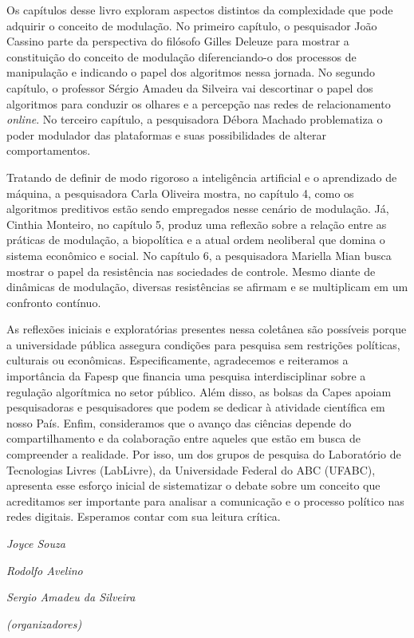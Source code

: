 Os capítulos desse livro exploram aspectos distintos da complexidade que
pode adquirir o conceito de modulação. No primeiro capítulo, o
pesquisador João Cassino parte da perspectiva do filósofo Gilles Deleuze
para mostrar a constituição do conceito de modulação diferenciando-o dos
processos de manipulação e indicando o papel dos algoritmos nessa
jornada. No segundo capítulo, o professor Sérgio Amadeu da Silveira vai
descortinar o papel dos algoritmos para conduzir os olhares e a
percepção nas redes de relacionamento \emph{online}. No terceiro
capítulo, a pesquisadora Débora Machado problematiza o poder modulador
das plataformas e suas possibilidades de alterar comportamentos.

Tratando de definir de modo rigoroso a inteligência artificial e o
aprendizado de máquina, a pesquisadora Carla Oliveira mostra, no
capítulo 4, como os algoritmos preditivos estão sendo empregados nesse
cenário de modulação. Já, Cinthia Monteiro, no capítulo 5, produz uma
reflexão sobre a relação entre as práticas de modulação, a biopolítica e
a atual ordem neoliberal que domina o sistema econômico e social. No
capítulo 6, a pesquisadora Mariella Mian busca mostrar o papel da
resistência nas sociedades de controle. Mesmo diante de dinâmicas de
modulação, diversas resistências se afirmam e se multiplicam em um
confronto contínuo.

As reflexões iniciais e exploratórias presentes nessa coletânea são
possíveis porque a universidade pública assegura condições para pesquisa
sem restrições políticas, culturais ou econômicas. Especificamente,
agradecemos e reiteramos a importância da Fapesp que financia uma
pesquisa interdisciplinar sobre a regulação algorítmica no setor
público. Além disso, as bolsas da Capes apoiam pesquisadoras e
pesquisadores que podem se dedicar à atividade científica em nosso País.
Enfim, consideramos que o avanço das ciências depende do
compartilhamento e da colaboração entre aqueles que estão em busca de
compreender a realidade. Por isso, um dos grupos de pesquisa do
Laboratório de Tecnologias Livres (LabLivre), da Universidade Federal do ABC
(UFABC), apresenta esse esforço inicial de sistematizar o debate sobre um
conceito que acreditamos ser importante para analisar a comunicação e o
processo político nas redes digitais. Esperamos contar com sua leitura
crítica.

\begin{flushright}
\emph{Joyce Souza}

\emph{Rodolfo Avelino}

\emph{Sergio Amadeu da Silveira}

\emph{(organizadores)}
\end{flushright}
